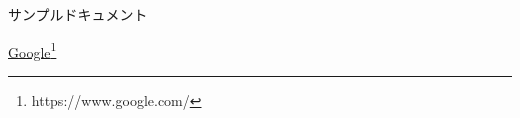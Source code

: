 \documentclass{jsarticle}
\begin{document}
  サンプルドキュメント

  \href{https://www.google.com/}{Google}\footnote{https://www.google.com/}
\end{document}

